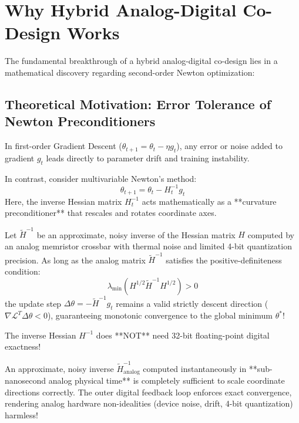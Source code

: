 \section{Why Hybrid Analog-Digital Co-Design Works}
The fundamental breakthrough of a hybrid analog-digital co-design lies in a mathematical discovery regarding second-order Newton optimization:

\subsection{Theoretical Motivation: Error Tolerance of Newton Preconditioners}
In first-order Gradient Descent ($\theta_{t+1} = \theta_t - \eta g_t$), any error or noise added to gradient $g_t$ leads directly to parameter drift and training instability.

In contrast, consider multivariable Newton's method:
\begin{equation}
\theta_{t+1} = \theta_t - H_t^{-1} g_t
\end{equation}
Here, the inverse Hessian matrix $H_t^{-1}$ acts mathematically as a **curvature preconditioner** that rescales and rotates coordinate axes.

\begin{theorem}
Let $\tilde{H}^{-1}$ be an approximate, noisy inverse of the Hessian matrix $H$ computed by an analog memristor crossbar with thermal noise and limited 4-bit quantization precision. As long as the analog matrix $\tilde{H}^{-1}$ satisfies the positive-definiteness condition:
$$\lambda_{\min}\left( H^{1/2} \tilde{H}^{-1} H^{1/2} \right) > 0$$
the update step $\Delta \theta = -\tilde{H}^{-1} g_t$ remains a valid strictly descent direction ($\nabla \mathcal{L}^T \Delta \theta < 0$), guaranteeing monotonic convergence to the global minimum $\theta^*$!
\end{theorem}

\begin{mathbox}
The inverse Hessian $H^{-1}$ does **NOT** need 32-bit floating-point digital exactness! 

An approximate, noisy inverse $\tilde{H}_{\text{analog}}^{-1}$ computed instantaneously in **sub-nanosecond analog physical time** is completely sufficient to scale coordinate directions correctly. The outer digital feedback loop enforces exact convergence, rendering analog hardware non-idealities (device noise, drift, 4-bit quantization) harmless!
\end{mathbox}


